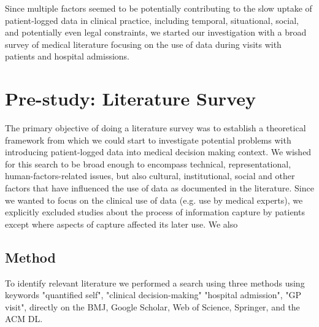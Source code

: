 \documentclass{sigchi}
\begin{document}
Since multiple factors seemed to be potentially contributing to the slow uptake of patient-logged data in clinical practice, including temporal, situational, social, and potentially even legal constraints, we started our investigation with a broad survey of medical literature focusing on the use of data during visits with patients and hospital admissions.  





\section{Pre-study: Literature Survey} 

The primary objective of doing a literature survey was to establish a theoretical framework from which we could start to investigate potential problems with introducing patient-logged data into medical decision making context.  We wished for this search to be broad enough to encompass technical, representational, human-factors-related issues, but also cultural, institutional, social and other factors that have influenced the use of data  as documented in the literature.  Since we wanted to focus on the clinical use of data (e.g. use by medical experts), we explicitly excluded studies about the process of information capture by patients except where aspects of capture affected its later use.  We also

\subsection{Method}
To identify relevant literature we performed a search using three methods using keywords "quantified self", "clinical decision-making" "hospital admission", "GP visit", directly on the BMJ, Google Scholar, Web of Science, Springer, and the ACM DL.
\end{document}
